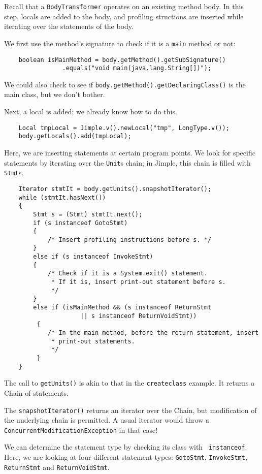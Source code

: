 \documentclass{article}
\begin{document}
Recall that a {\tt BodyTransformer} operates on an existing method
body.  In this step, locals are added to the body, and profiling structions
are inserted while iterating over the statements of the body. 

We first use the method's signature to check if it is a {\tt main}
method or not:
\begin{verbatim}
    boolean isMainMethod = body.getMethod().getSubSignature()
                .equals("void main(java.lang.String[])");
\end{verbatim}
We could also check to see if {\tt body.getMethod().getDeclaringClass()}
is the main class, but we don't bother.

Next, a local is added; we already know how to do this.
\begin{verbatim}
    Local tmpLocal = Jimple.v().newLocal("tmp", LongType.v());
    body.getLocals().add(tmpLocal);
\end{verbatim}

Here, we are inserting statements at certain program
points.  We look for specific statements by iterating over the
{\tt Unit}s chain; in Jimple, this chain is filled with {\tt Stmt}s.

\begin{verbatim}
    Iterator stmtIt = body.getUnits().snapshotIterator();
    while (stmtIt.hasNext())
    {
        Stmt s = (Stmt) stmtIt.next();
        if (s instanceof GotoStmt)
        {
            /* Insert profiling instructions before s. */
        }
        else if (s instanceof InvokeStmt)
        {
            /* Check if it is a System.exit() statement.
             * If it is, insert print-out statement before s.
             */
        }
        else if (isMainMethod && (s instanceof ReturnStmt 
                     || s instanceof ReturnVoidStmt))
         {
            /* In the main method, before the return statement, insert
             * print-out statements.
             */
         }
    }
\end{verbatim}

The call to {\tt getUnits()} is akin to that in the {\tt createclass}
example. It returns a Chain of statements. 

The {\tt snapshotIterator()} returns an iterator over the Chain,
but modification of the underlying chain is permitted.  A usual iterator
would throw a {\tt ConcurrentModificationException} in that case!

We can determine the statement type by checking its class with {\tt
instanceof}.  Here, we are looking at four different statement types:
{\tt GotoStmt}, {\tt InvokeStmt}, {\tt ReturnStmt} and {\tt ReturnVoidStmt}.
\end{document}
